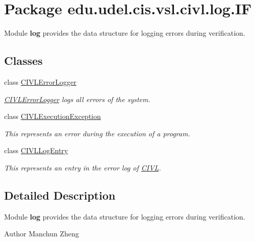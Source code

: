 \hypertarget{namespaceedu_1_1udel_1_1cis_1_1vsl_1_1civl_1_1log_1_1IF}{}\section{Package edu.\+udel.\+cis.\+vsl.\+civl.\+log.\+I\+F}
\label{namespaceedu_1_1udel_1_1cis_1_1vsl_1_1civl_1_1log_1_1IF}


Module {\bfseries log} provides the data structure for logging errors during verification.  


\subsection*{Classes}
\begin{DoxyCompactItemize}
\item 
class \hyperlink{classedu_1_1udel_1_1cis_1_1vsl_1_1civl_1_1log_1_1IF_1_1CIVLErrorLogger}{C\+I\+V\+L\+Error\+Logger}
\begin{DoxyCompactList}\small\item\em \hyperlink{classedu_1_1udel_1_1cis_1_1vsl_1_1civl_1_1log_1_1IF_1_1CIVLErrorLogger}{C\+I\+V\+L\+Error\+Logger} logs all errors of the system. \end{DoxyCompactList}\item 
class \hyperlink{classedu_1_1udel_1_1cis_1_1vsl_1_1civl_1_1log_1_1IF_1_1CIVLExecutionException}{C\+I\+V\+L\+Execution\+Exception}
\begin{DoxyCompactList}\small\item\em This represents an error during the execution of a program. \end{DoxyCompactList}\item 
class \hyperlink{classedu_1_1udel_1_1cis_1_1vsl_1_1civl_1_1log_1_1IF_1_1CIVLLogEntry}{C\+I\+V\+L\+Log\+Entry}
\begin{DoxyCompactList}\small\item\em This represents an entry in the error log of \hyperlink{classedu_1_1udel_1_1cis_1_1vsl_1_1civl_1_1CIVL}{C\+I\+V\+L}. \end{DoxyCompactList}\end{DoxyCompactItemize}


\subsection{Detailed Description}
Module {\bfseries log} provides the data structure for logging errors during verification. 

\begin{DoxyAuthor}{Author}
Manchun Zheng 
\end{DoxyAuthor}
